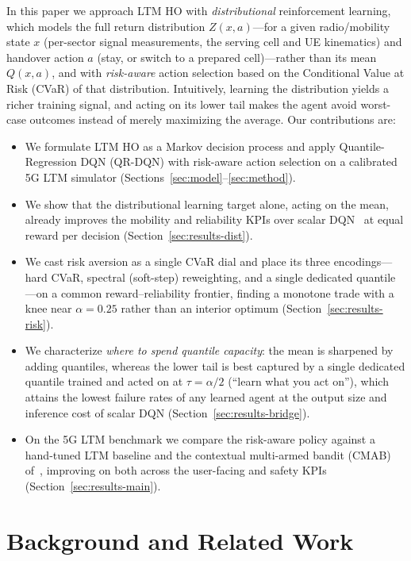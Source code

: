 \documentclass[conference]{IEEEtran}
\begin{document}
In this paper we approach LTM HO with \emph{distributional} reinforcement learning, which models the full return distribution $Z(x,a)$---for a given radio/mobility state $x$ (per-sector signal measurements, the serving cell and UE kinematics) and handover action $a$ (stay, or switch to a prepared cell)---rather than its mean $Q(x,a)$, and with \emph{risk-aware} action selection based on the Conditional Value at Risk (CVaR) of that distribution.
Intuitively, learning the distribution yields a richer training signal, and acting on its lower tail makes the agent avoid worst-case outcomes instead of merely maximizing the average.
Our contributions are:\begin{itemize}
  \item We formulate LTM HO as a Markov decision process and apply
  Quantile-Regression DQN (QR-DQN) with risk-aware action selection on a
  calibrated 5G LTM simulator (Sections~\ref{sec:model}--\ref{sec:method}).
  \item We show that the distributional learning target alone, acting on the mean,
  already improves the mobility and reliability KPIs over scalar DQN~\cite{dqn} at equal
  reward per decision (Section~\ref{sec:results-dist}).
  \item We cast risk aversion as a single CVaR dial and place its three
  encodings---hard CVaR, spectral (soft-step) reweighting, and a single dedicated
  quantile---on a common reward--reliability frontier, finding a monotone trade
  with a knee near $\alpha=0.25$ rather than an interior optimum
  (Section~\ref{sec:results-risk}).
  \item We characterize \emph{where to spend quantile capacity}: the mean is
  sharpened by adding quantiles, whereas the lower tail is best captured by a
  single dedicated quantile trained and acted on at $\tau=\alpha/2$ (``learn what
  you act on''), which attains the lowest failure rates of any learned agent at the
  output size and inference cost of scalar DQN (Section~\ref{sec:results-bridge}).
  \item On the 5G LTM benchmark we compare the risk-aware policy against a
  hand-tuned LTM baseline and the contextual
  multi-armed bandit (CMAB) of~\cite{cmab_ho}, improving on both across the
  user-facing and safety KPIs (Section~\ref{sec:results-main}).
\end{itemize}


\section{Background and Related Work}
\label{sec:related}
\end{document}
